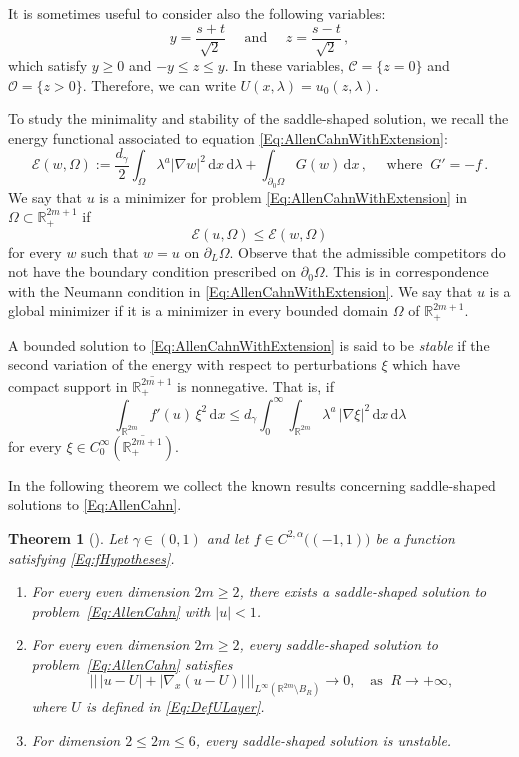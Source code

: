 \documentclass[12pt,reqno]{amsart}
\newtheorem{theorem}{Theorem}[section]
\theoremstyle{definition}
\theoremstyle{remark}
\newcommand{\con}[1]{\mathbb{#1}}
\newcommand{\R}{\con{R}} %
\newcommand{\ccal}{\mathscr{C}}
\newcommand{\ecal}{\mathcal{E}}
\newcommand{\ocal}{\mathcal{O}}
\newcommand{\s}{\gamma}
\renewcommand{\d}{\,\mathrm{d}} %
\numberwithin{equation}{section}
\begin{document}
It is sometimes useful to consider also the following variables:
$$
y = \dfrac{s+t}{\sqrt{2}} \quad \text{ and } \quad z = \dfrac{s-t}{\sqrt{2}} \,,
$$
which satisfy $y\geq 0$ and $-y \leq z \leq y$. In these variables, $\ccal = \{ z = 0\}$ and $\ocal = \{ z > 0\}$. Therefore, we can write $U(x,\lambda) = u_0(z, \lambda)$.
 
 
To study the minimality and stability of the saddle-shaped solution, we recall the energy functional associated to equation \eqref{Eq:AllenCahnWithExtension}:
$$
\ecal (w, \Omega) := \dfrac{d_\s}{2}\int_{\Omega} \lambda^a | \nabla w |^2 \d x \d \lambda + \int_{\partial_0 \Omega} G(w)\d x\,, \quad \text{ where }\ G' = -f\,.
$$
We say that $u$ is a minimizer for problem \eqref{Eq:AllenCahnWithExtension} in  $\Omega \subset \R^{2m+1}_+$ if
$$
\ecal(u,\Omega) \leq \ecal(w,\Omega)
$$
for every $w$ such that $w=u$ on $\partial_L \Omega$. Observe that the admissible competitors do not have the boundary condition prescribed on $\partial_0\Omega$. This is in correspondence with the Neumann condition in \eqref{Eq:AllenCahnWithExtension}. We say that $u$ is a global minimizer if it is a minimizer in every bounded domain $\Omega$ of $\R^{2m+1}_+$.

A bounded solution to \eqref{Eq:AllenCahnWithExtension} is said to be \emph{stable} if the second variation of the energy with respect to perturbations $\xi$ which have compact support in $\overline{\R^{2m+1}_+}$ is nonnegative. That is, if
\begin{equation}
\label{Eq:StabilityCondition}
\int_{\R^{2m}} f'(u) \, \xi^2 \d x  \leq d_\s \int_0^\infty \int_{\R^{2m}} \lambda^a \, |\nabla \xi|^2 \d x \d \lambda 
\end{equation}
for every $\xi \in C^\infty_0(\overline{\R^{2m+1}_+})$.

In the following theorem we collect the known results concerning saddle-shaped solutions to \eqref{Eq:AllenCahn}. 

\begin{theorem}[\cite{Cinti-Saddle,Cinti-Saddle2,CabreSolaMorales,CabreSireII}]
\label{Th:Summary}
Let $\s \in (0,1)$  and let $f\in C^{2,\alpha}\big((-1,1)\big)$ be a function satisfying \eqref{Eq:fHypotheses}.
\begin{enumerate}[label=(\roman{*})]
\item For every even dimension $2m\geq 2$, there exists a saddle-shaped solution to  problem~\eqref{Eq:AllenCahn} with $|u|<1$.
\item For every even dimension $2m\geq 2$, every saddle-shaped solution to problem~\eqref{Eq:AllenCahn} satisfies
$$ \big|\big| \, |u-U| + |\nabla_x(u-U)| \, \big|\big|_{L^\infty(\R^{2m}\setminus B_R)} \to 0, \ \ \ \text{ as } \ R\to+\infty, $$
where $U$ is defined in \eqref{Eq:DefULayer}.
\item For dimension $2\leq 2m \leq 6$, every saddle-shaped solution is unstable.
\end{enumerate}
\end{theorem}
\end{document}
